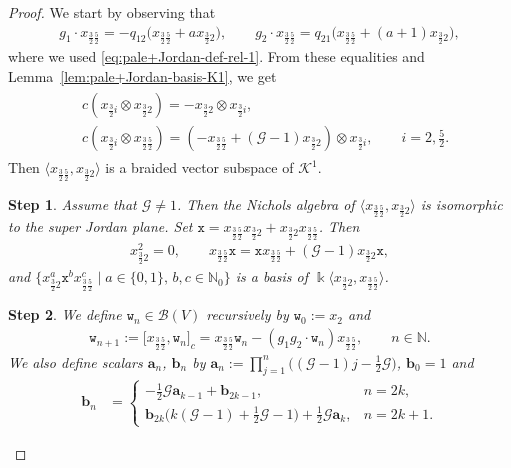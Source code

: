\documentclass[pdftex]{sigma}
\numberwithin{equation}{section}
\newtheorem{stepiv}{Step}
\newcommand{\toba}{\mathscr B}
\newcommand{\ghost}{\mathscr{G}}
\newcommand{\K}{{\mathcal{K}}}
\newcommand{\ab}{\mathbf a}
\newcommand{\bb}{\mathbf b}
\newcommand{\N}{{\mathbb N}}
\newcommand{\wt}{\mathtt{w}}
\newcommand{\xt}{\mathtt{x}}
\newcommand{\tresdos}{\frac{3}{2}}
\newcommand{\cincodos}{\frac{5}{2}}
\begin{document}
\begin{proof} We start by observing that
\begin{align*}
g_1\cdot x_{\tresdos\cincodos} = -q_{12}\big(x_{\tresdos\cincodos}+ax_{\tresdos2}\big),\qquad
g_2\cdot x_{\tresdos\cincodos} = q_{21}\big(x_{\tresdos\cincodos}+(a+1)x_{\tresdos2}\big),
\end{align*}
where we used \eqref{eq:pale+Jordan-def-rel-1}.
From these equalities and Lemma~\ref{lem:pale+Jordan-basis-K1}, we get
\begin{align}\label{eq:pale+Jordan-g=1-subspace}
\begin{aligned}
&c(x_{\tresdos i} \otimes x_{\tresdos2}) = -x_{\tresdos2} \otimes x_{\tresdos i}, \\
&c(x_{\tresdos i} \otimes x_{\tresdos\cincodos}) = (-x_{\tresdos\cincodos}+(\ghost-1)x_{\tresdos2}) \otimes x_{\tresdos i},\qquad i = 2,\tfrac{5}{2}.
\end{aligned}
\end{align}
Then $\langle x_{\tresdos\cincodos},x_{\tresdos2}\rangle$ is a braided vector subspace of $\K^1$.

\begin{stepiv}
Assume that $\ghost \neq 1$. Then the Nichols algebra of $\big\langle x_{\tresdos\cincodos},x_{\tresdos2}\big\rangle$ is
isomorphic to the super Jordan plane. Set $\xt=x_{\tresdos\cincodos}x_{\tresdos2}+x_{\tresdos2}x_{\tresdos\cincodos}$. Then
\begin{align}\label{eq:pale+Jordan-def-rel-3}
x_{\tresdos2}^2 =0, \qquad
x_{\tresdos\cincodos}\xt = \xt x_{\tresdos\cincodos} +(\ghost-1) x_{\tresdos2}\xt,
\end{align}
and $\big\{x_{\tresdos2}^a \xt^b x_{\tresdos\cincodos}^c \mid a\in\{0,1\}, \, b,c \in\N_0\big\}$
is a basis of $\Bbbk \big\langle x_{\tresdos2}, x_{\tresdos\cincodos}\big\rangle$.
\end{stepiv}

\begin{stepiv}\label{lem:pale+Jordan-K1-action-derivations}
We define $\wt_n\in\toba(V)$ recursively by
$\wt_0 := x_2$ and
\begin{align*}
\wt_{n+1} := \big[x_{\tresdos\cincodos},\wt_n\big]_c =x_{\tresdos\cincodos}\wt_n -(g_1g_2\cdot \wt_n) x_{\tresdos\cincodos},\qquad
 n\in\N.
\end{align*}
We also define scalars $\ab_n$, $\bb_n$ by $\ab_n := \prod_{j=1}^n \big((\ghost-1)j - \frac{1}{2}\ghost\big)$, $\bb_0=1$ and
\begin{align*}
\bb_{n} &= \begin{cases}
- \frac{1}{2}\ghost\ab_{k-1} +\bb_{2k-1}, & n=2k,
\\
\bb_{2k} \big(k(\ghost-1) + \frac{1}{2}\ghost -1\big) + \frac{1}{2}\ghost\ab_k, & n=2k+1.
\end{cases}
\end{align*}


\end{stepiv}
\end{proof}
\end{document}
